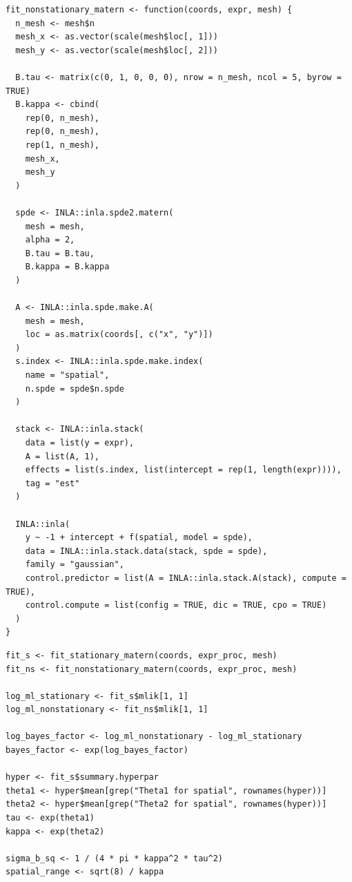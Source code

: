 \begin{lstlisting}[style=rcode,caption={Nonstationary Matern SPDE model and INLA fitting call.}]
fit_nonstationary_matern <- function(coords, expr, mesh) {
  n_mesh <- mesh$n
  mesh_x <- as.vector(scale(mesh$loc[, 1]))
  mesh_y <- as.vector(scale(mesh$loc[, 2]))

  B.tau <- matrix(c(0, 1, 0, 0, 0), nrow = n_mesh, ncol = 5, byrow = TRUE)
  B.kappa <- cbind(
    rep(0, n_mesh),
    rep(0, n_mesh),
    rep(1, n_mesh),
    mesh_x,
    mesh_y
  )

  spde <- INLA::inla.spde2.matern(
    mesh = mesh,
    alpha = 2,
    B.tau = B.tau,
    B.kappa = B.kappa
  )

  A <- INLA::inla.spde.make.A(
    mesh = mesh,
    loc = as.matrix(coords[, c("x", "y")])
  )
  s.index <- INLA::inla.spde.make.index(
    name = "spatial",
    n.spde = spde$n.spde
  )

  stack <- INLA::inla.stack(
    data = list(y = expr),
    A = list(A, 1),
    effects = list(s.index, list(intercept = rep(1, length(expr)))),
    tag = "est"
  )

  INLA::inla(
    y ~ -1 + intercept + f(spatial, model = spde),
    data = INLA::inla.stack.data(stack, spde = spde),
    family = "gaussian",
    control.predictor = list(A = INLA::inla.stack.A(stack), compute = TRUE),
    control.compute = list(config = TRUE, dic = TRUE, cpo = TRUE)
  )
}
\end{lstlisting}

\begin{lstlisting}[style=rcode,caption={Marginal likelihood Bayes factor and stationary-equivalent summaries.}]
fit_s <- fit_stationary_matern(coords, expr_proc, mesh)
fit_ns <- fit_nonstationary_matern(coords, expr_proc, mesh)

log_ml_stationary <- fit_s$mlik[1, 1]
log_ml_nonstationary <- fit_ns$mlik[1, 1]

log_bayes_factor <- log_ml_nonstationary - log_ml_stationary
bayes_factor <- exp(log_bayes_factor)

hyper <- fit_s$summary.hyperpar
theta1 <- hyper$mean[grep("Theta1 for spatial", rownames(hyper))]
theta2 <- hyper$mean[grep("Theta2 for spatial", rownames(hyper))]
tau <- exp(theta1)
kappa <- exp(theta2)

sigma_b_sq <- 1 / (4 * pi * kappa^2 * tau^2)
spatial_range <- sqrt(8) / kappa
\end{lstlisting}

